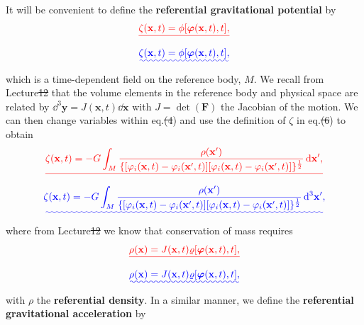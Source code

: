 \documentclass[a4paper,12pt]{paper}
\providecommand{\DIFadd}[1]{{\protect\color{blue}\uwave{#1}}} %
\providecommand{\DIFdel}[1]{{\protect\color{red}\sout{#1}}}                      %
\providecommand{\DIFaddbegin}{} %
\providecommand{\DIFaddend}{} %
\providecommand{\DIFdelbegin}{} %
\providecommand{\DIFdelend}{} %
\begin{document}
\DIFaddend It will be convenient to define the \textbf{referential gravitational potential} by
\DIFdelbegin \begin{displaymath}
\DIFdel{\zeta(\mathbf{x},t)=\phi[\bphi(\mathbf{x},t),t],
}\end{displaymath}%
\DIFdelend \DIFaddbegin \begin{equation}
\DIFadd{\zeta(\mathbf{x},t)=\phi[\bphi(\mathbf{x},t),t],
\label{eq:6}
}\end{equation}\DIFaddend 
which is a time-dependent field on the reference body, $M$. We recall from Lecture\DIFdelbegin \DIFdel{12 }\DIFdelend \DIFaddbegin \DIFadd{~13 }\DIFaddend that the volume elements in 
the reference body and physical space are related by \DIFdelbegin \DIFdel{$\dd^{3}\mathbf{y} = J(\mathbf{x},t)\dd\mathbf{x}$ }\DIFdelend \DIFaddbegin \DIFadd{$\dd^{3}\mathbf{y} = J(\mathbf{x},t)\dd^{3}\mathbf{x}$ }\DIFaddend with $J=\det(\mathbf{F})$ 
the Jacobian of the motion. We can then change variables within eq.\DIFdelbegin \DIFdel{(4}\DIFdelend \DIFaddbegin \DIFadd{~(\ref{eq:4}}\DIFaddend ) and use the definition of $\zeta$ in eq.\DIFdelbegin \DIFdel{(6}\DIFdelend \DIFaddbegin \DIFadd{~(\ref{eq:6}}\DIFaddend ) to obtain
\DIFdelbegin \begin{displaymath}
\DIFdel{\zeta(\mathbf{x},t)=-G\int_{M}\frac{\rho(\mathbf{x}')}{\{[\varphi_{i}(\mathbf{x},t)-\varphi_{i}(\mathbf{x}',t)]
[\varphi_{i}(\mathbf{x},t)-\varphi_{i}(\mathbf{x}',t)]\}^{\frac{1}{2}}}\dd\mathbf{x}',
}\end{displaymath}%
\DIFdelend \DIFaddbegin \begin{equation}
\DIFadd{\zeta(\mathbf{x},t)=-G\int_{M}\frac{\rho(\mathbf{x}')}{\{[\varphi_{i}(\mathbf{x},t)-\varphi_{i}(\mathbf{x}',t)]
[\varphi_{i}(\mathbf{x},t)-\varphi_{i}(\mathbf{x}',t)]\}^{\frac{1}{2}}}\dd^{3}\mathbf{x}',
\label{eq:7}
}\end{equation}\DIFaddend 
where from Lecture\DIFdelbegin \DIFdel{12 }\DIFdelend \DIFaddbegin \DIFadd{~13 }\DIFaddend we know that conservation of mass requires
\DIFdelbegin \begin{displaymath}
\DIFdel{\rho(\mathbf{x})=J(\mathbf{x},t)\varrho[\bphi(\mathbf{x},t),t],
}\end{displaymath}%
\DIFdelend \DIFaddbegin \begin{equation}
\DIFadd{\rho(\mathbf{x})=J(\mathbf{x},t)\varrho[\bphi(\mathbf{x},t),t],
\label{eq:8}
}\end{equation}\DIFaddend 
with $\rho$ the \textbf{referential density}. In a similar manner, we define the \textbf{referential gravitational acceleration} by
\end{document}
